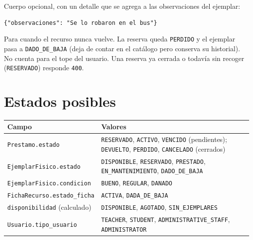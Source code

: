 \documentclass[11pt]{article}
\newcommand{\us}{\_\allowbreak}
\newcommand{\dt}{.\allowbreak}
\begin{document}
Cuerpo opcional, con un detalle que se agrega a las observaciones del ejemplar:
\begin{lstlisting}
{"observaciones": "Se lo robaron en el bus"}
\end{lstlisting}
Para cuando el recurso nunca vuelve. La reserva queda \texttt{PERDIDO} y el ejemplar pasa a \texttt{DADO\us DE\us BAJA} (deja de contar en el cat\'alogo pero conserva su historial). No cuenta para el tope del usuario. Una reserva ya cerrada o todav\'ia sin recoger (\texttt{RESERVADO}) responde \texttt{400}.

\section{Estados posibles}

\begin{longtable}{p{4.3cm}p{10.7cm}}
\textbf{Campo} & \textbf{Valores} \\
\hline
\endhead
\texttt{Prestamo\dt estado} & \texttt{RESERVADO}, \texttt{ACTIVO}, \texttt{VENCIDO} (pendientes); \texttt{DEVUELTO}, \texttt{PERDIDO}, \texttt{CANCELADO} (cerrados) \\
\texttt{EjemplarFisico\dt estado} & \texttt{DISPONIBLE}, \texttt{RESERVADO}, \texttt{PRESTADO}, \texttt{EN\us MANTENIMIENTO}, \texttt{DADO\us DE\us BAJA} \\
\texttt{EjemplarFisico\dt condicion} & \texttt{BUENO}, \texttt{REGULAR}, \texttt{DANADO} \\
\texttt{FichaRecurso\dt estado\us ficha} & \texttt{ACTIVA}, \texttt{DADA\us DE\us BAJA} \\
\texttt{disponibilidad} (calculado) & \texttt{DISPONIBLE}, \texttt{AGOTADO}, \texttt{SIN\us EJEMPLARES} \\
\texttt{Usuario\dt tipo\us usuario} & \texttt{TEACHER}, \texttt{STUDENT}, \texttt{ADMINISTRATIVE\us STAFF}, \texttt{ADMINISTRATOR} \\
\end{longtable}
\end{document}
